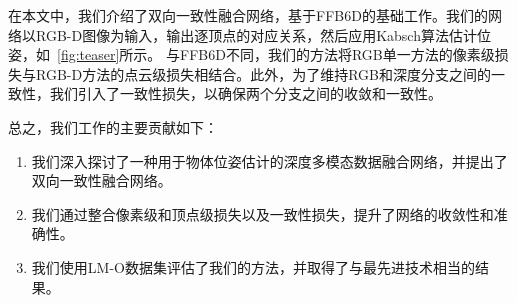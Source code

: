 在本文中，我们介绍了双向一致性融合网络，基于FFB6D\cite{he2021ffb6d}的基础工作。我们的网络以RGB-D图像为输入，输出逐顶点的对应关系，然后应用Kabsch算法估计位姿，如~\cref{fig:teaser}所示。
与FFB6D不同，我们的方法将RGB单一方法的像素级损失与RGB-D方法的点云级损失相结合。此外，为了维持RGB和深度分支之间的一致性，我们引入了一致性损失，以确保两个分支之间的收敛和一致性。

总之，我们工作的主要贡献如下：
\begin{enumerate}
\item 我们深入探讨了一种用于物体位姿估计的深度多模态数据融合网络，并提出了双向一致性融合网络。
\item 我们通过整合像素级和顶点级损失以及一致性损失，提升了网络的收敛性和准确性。
\item 我们使用LM-O数据集评估了我们的方法，并取得了与最先进技术相当的结果。
\end{enumerate}

